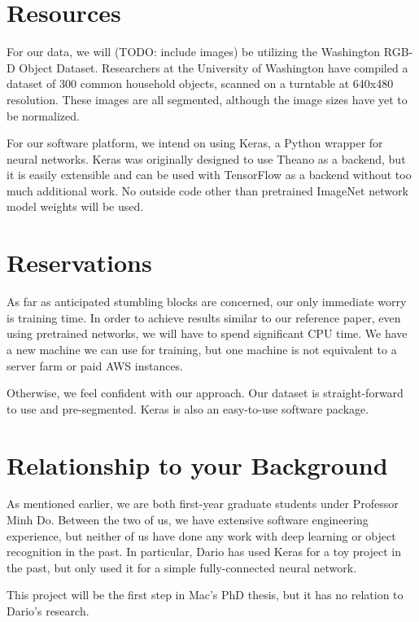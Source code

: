 \documentclass[paper=letter, fontsize=12pt]{article}
\begin{document}
\section{Resources}

For our data, we will (TODO: include images) be utilizing the Washington RGB-D
Object Dataset. Researchers at the University of Washington have compiled a
dataset of 300 common household objects, scanned on a turntable at 640x480
resolution. These images are all segmented, although the image sizes have yet to
be normalized.

For our software platform, we intend on using Keras, a Python wrapper for neural
networks. Keras was originally designed to use Theano as a backend, but it is
easily extensible and can be used with TensorFlow as a backend without too much
additional work. No outside code other than pretrained ImageNet network model
weights will be used.


\section{Reservations}

As far as anticipated stumbling blocks are concerned, our only immediate worry
is training time. In order to achieve results similar to our reference paper,
even using pretrained networks, we will have to spend significant CPU time. We
have a new machine we can use for training, but one machine is not equivalent to
a server farm or paid AWS instances.

Otherwise, we feel confident with our approach. Our dataset is straight-forward
to use and pre-segmented. Keras is also an easy-to-use software package.


\section{Relationship to your Background}

As mentioned earlier, we are both first-year graduate students under Professor
Minh Do. Between the two of us, we have extensive software engineering experience, but neither of us have done any work with deep learning or object recognition in the past. In particular, Dario has used Keras for a toy project in the past, but only used it for a simple fully-connected neural network.

This project will be the first step in Mac's PhD thesis, but it has no relation to Dario's research. 


\end{document}
